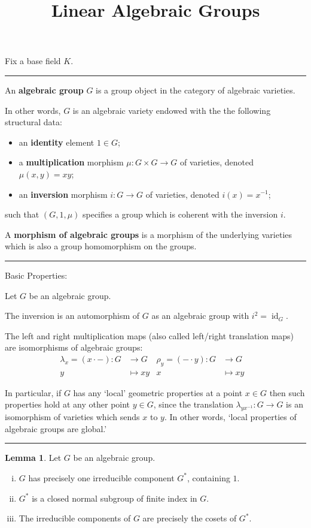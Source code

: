 \documentclass[12pt]{article}
\newcommand{\keyword}[1]{\textbf{#1}}
\newcommand{\sepline}{\rule{\textwidth}{0.4pt}}
\theoremstyle{definition}
\newtheorem{lemma}{Lemma}
\newcommand{\<}{\langle}
\renewcommand{\>}{\rangle}
\DeclareMathOperator{\id}{id}
\begin{document}
\title{Linear Algebraic Groups}
\author{}
\date{}

Fix a base field $K$.

\sepline

An \keyword{algebraic group} $G$ is a group object in the category of algebraic varieties.

In other words, $G$ is an algebraic variety endowed with the the following structural data:
\begin{itemize}
    \item an \keyword{identity} element $1 \in G$;
    \item a \keyword{multiplication} morphism $\mu : G \times G \to G$ of varieties, denoted $\mu(x, y) = xy$;
    \item an \keyword{inversion} morphism $i : G \to G$ of varieties, denoted $i(x) = x^{-1}$;
\end{itemize}
such that $(G, 1, \mu)$ specifies a group which is coherent with the inversion $i$.

A \keyword{morphism of algebraic groups} is a morphism of the underlying varieties which is also a group homomorphism on the groups.

\sepline

Basic Properties:

Let $G$ be an algebraic group.

The inversion is an automorphism of $G$ as an algebraic group with $i^2 = \id_G$.

The left and right multiplication maps (also called left/right translation maps) are isomorphisms of algebraic groups:
\begin{align*}
    \lambda_x = (x \cdot -) : G &\to G & \rho_y = (- \cdot y) : G &\to G & \\
    y & \mapsto xy & x &\mapsto xy
\end{align*}

In particular, if $G$ has any `local' geometric properties at a point $x \in G$ then such properties hold at any other point $y \in G$, since the translation $\lambda_{yx^{-1}} : G \to G$ is an isomorphism of varieties which sends $x$ to $y$.
In other words, `local properties of algebraic groups are global.'

\sepline

\begin{lemma}
    Let $G$ be an algebraic group.
    \begin{enumerate}[(i)]
        \item $G$ has precisely one irreducible component $G^*$, containing $1$.
        \item $G^*$ is a closed normal subgroup of finite index in $G$.
        \item The irreducible components of $G$ are precisely the cosets of $G^*$.
    \end{enumerate}
\end{lemma}
\end{document}
